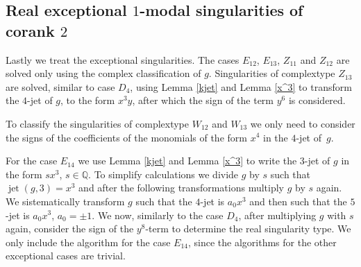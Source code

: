 \documentclass{amsproc}
\DeclareMathOperator{\jt}{jet}
\begin{document}
\subsection{Real exceptional $1$-modal singularities of corank $2$}\label{ExceptionalSingularities}
Lastly we treat the exceptional singularities. The cases $E_{12}$, $E_{13}$, $Z_{11}$ and $Z_{12}$ are solved only using the complex classification of $g$. Singularities of complextype $Z_{13}$ are solved, similar to case $D_{4}$, using Lemma \ref{kjet} and Lemma \ref{x^3} to transform the $4$-jet of $g$, to the form $x^3y$, after which the sign of the term $y^6$ is considered. 

To classify the singularities of complextype $W_{12}$ and $W_{13}$ we only need to consider the signs of the coefficients of the monomials of the form $x^4$ in the $4$-jet of~$g$.

For the case $E_{14}$ we use Lemma \ref{kjet} and Lemma \ref{x^3} to write the $3$-jet of $g$ in the form $sx^3$, $s\in\mathbb Q$. To simplify calculations we divide $g$ by $s$ such that $\jt(g,3)=x^3$ and after the following transformations multiply $g$ by $s$ again. We sistematically transform $g$ such that the $4$-jet is $a_0x^3$ and then such that the $5$-jet is $a_0x^3$, $a_0=\pm 1$.  We now, similarly to the case $D_4$, after multiplying $g$ with $s$ again, consider the sign of the $y^8$-term to determine the real singularity type. We only include the algorithm for the case $E_{14}$, since the algorithms for the other exceptional cases are trivial.
\end{document}

